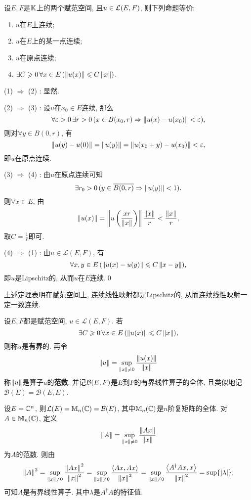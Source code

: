 \begin{Theorem}[连续性]\label{thm:线性算子连续性}
	设$ E, F $是$ \mathbb{K} $上的两个赋范空间, 且$ u\in\mathcal{L}(E,F) $, 则下列命题等价:
	\begin{enumerate}[(1)]
		\item $ u $在$ E $上连续;
		\item $ u $在$ E $上的某一点连续;
		\item $ u $在原点连续;
		\item $ \exists C\geqslant 0\,\forall x\in E\,(\left\| u(x) \right\|\leqslant C\left\| x \right\|) $.
	\end{enumerate}
\end{Theorem}
\begin{Proof}
	(1) $ \Rightarrow $ (2) : 显然.

	(2) $ \Rightarrow $ (3) : 设$ u $在$ x_0\in E $连续, 那么
	\[
		\forall\varepsilon>0\,\exists r>0\,(x\in B(x_0,r)\Rightarrow\left\| u(x)-u(x_0) \right\|<\varepsilon),
	\]
	则对$ \forall y\in B(0,r) $, 有
	\[
		\left\| u(y)-u(0) \right\|=\left\| u(y) \right\|=\left\| u(x_0+y)-u(x_0) \right\|<\varepsilon,
	\]
	即$ u $在原点连续.

	(3) $ \Rightarrow $ (4) : 由$ u $在原点连续可知
	\[
		\exists r_0>0\,(y\in\overline{B(0,r)}\Rightarrow\left\| u(y) \right\|<1).
	\]
	则$ \forall x\in E $, 由
	\[
		\left\| u(x) \right\|=\left\| u\left(\dfrac{xr}{\left\| x \right\|}\right) \right\|\frac{\left\| x \right\|}{r}<\frac{\left\| x \right\|}{r},
	\]
	取$ C=\frac{1}{r} $即可.

	(4) $ \Rightarrow $ (1) : 由$ u\in\mathcal{L}(E,F) $, 有
	\[
		\forall x,y\in E\,(\left\| u(x)-u(y) \right\|\leqslant C\left\| x-y \right\|),
	\]
	即$ u $是Lipschitz的, 从而$ u $在$ E $连续.\qed
\end{Proof}

\begin{Remark}
	上述定理表明在赋范空间上, 连续线性映射都是Lipschitz的, 从而连续线性映射一定一致连续.
\end{Remark}

\begin{Definition}[算子范数]
	设$ E,F $都是赋范空间, $ u\in\mathcal{L}(E,F) $. 若
	\[
		\exists C\geqslant 0\,\forall x\in E\,(\left\| u(x) \right\|\leqslant C\left\| x \right\|),
	\]
	则称$ u $是\textbf{有界}的. 再令
	\[
		\left\| u \right\|=\sup_{\left\| x \right\|\ne 0}\frac{\left\| u(x) \right\|}{\left\| x \right\|}
	\]
	称$ \left\| u \right\| $是算子$ u $的\textbf{范数}. 并记$ \mathcal{B}(E,F) $是$ E $到$ F $的有界线性算子的全体, 且类似地记$ \mathcal{B}(E)=\mathcal{B}(E,E) $.
\end{Definition}

\begin{Example}
	设$ E=\mathbb{C}^n $, 则$ \mathcal{L}(E)=\mathbb{M}_n(\mathbb{C})=\mathcal{B}(E) $, 其中$ \mathbb{M}_n(\mathbb{C}) $是$ n $阶复矩阵的全体. 对$ A\in\mathbb{M}_n(\mathbb{C}) $, 定义
	\[
		\left\| A \right\|=\sup_{\left\| x \right\|\ne 0}\frac{\left\| Ax \right\|}{\left\| x \right\|}
	\]
	为$ A $的范数. 则由
	\[
		\left\| A \right\|^2=\sup_{\left\| x \right\|\ne 0}\frac{\left\| Ax \right\|^2}{\left\| x \right\|^2}=\sup_{\left\| x \right\|\ne 0}\frac{\left\langle Ax,Ax \right\rangle}{\left\| x \right\|^2}=\sup_{\left\| x \right\|\ne 0}\frac{\left\langle A^\dagger Ax,x \right\rangle}{\left\| x \right\|^2}=\sup\{\left| \lambda \right| \},
	\]
	可知$ A $是有界线性算子. 其中$ \lambda $是$ A^\dagger A $的特征值.
\end{Example}

